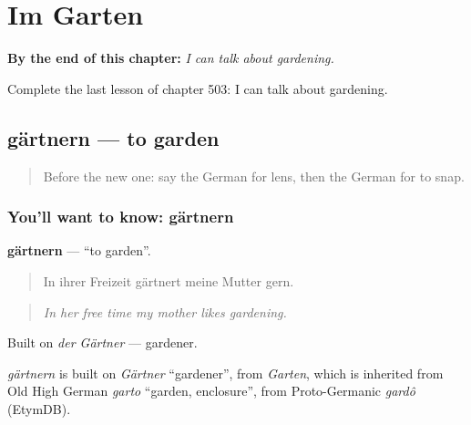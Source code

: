 
\chapter{Im Garten}
\label{ch:ge-im-garten}

\begin{chapteropening}
\textbf{By the end of this chapter:} \emph{I can talk about gardening.}

Complete the last lesson of chapter 503: I can talk about gardening.
\end{chapteropening}

\section[gärtnern]{gärtnern — to garden}

\label{lesson:GE-C503-gaertnern}



\begin{quote}
Before the new one: say the German for lens, then the German for to snap.
\end{quote}

\subsection*{You'll want to know: gärtnern}
\textbf{gärtnern} — \textquotedblleft{}to garden\textquotedblright{}.

\begin{quote}
In ihrer Freizeit gärtnert meine Mutter gern.
\end{quote}

\begin{quote}
\emph{In her free time my mother likes gardening.}
\end{quote}

Built on \emph{der Gärtner} — gardener.

\begin{cousinweb}
\emph{gärtnern} is built on \emph{Gärtner} \textquotedblleft{}gardener\textquotedblright{}, from \emph{Garten}, which is inherited from Old High German \emph{garto} \textquotedblleft{}garden, enclosure\textquotedblright{}, from Proto-Germanic \emph{gardô} (EtymDB).
\end{cousinweb}

